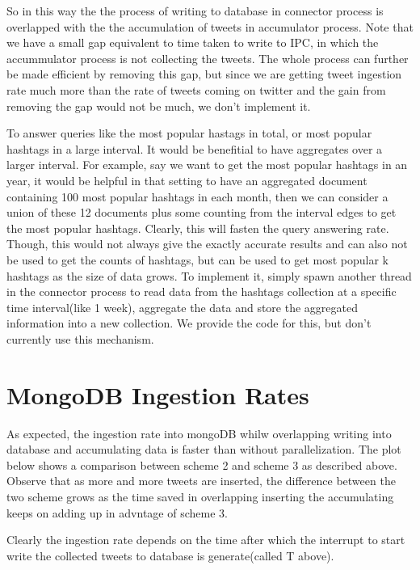 \documentclass[letterpaper,10pt,english]{sphinxmanual}
\begin{document}
So in this way the the process of writing to database in connector process is overlapped with the the accumulation of tweets in accumulator process. Note that we have a small gap equivalent to time taken to write to IPC, in which the accummulator process is not collecting the tweets. The whole process can further be made efficient by removing this gap, but since we are getting tweet ingestion rate much more than the rate of tweets coming on twitter and the gain from removing the gap would not be much, we don’t implement it.

To answer queries like the most popular hastags in total, or most popular hashtags in a large interval. It would be benefitial to have aggregates over a larger interval. For example, say we want to get the most popular hashtags in an year, it would be helpful in that setting to have an aggregated document containing 100 most popular hashtags in each month, then we can consider a union of these 12 documents plus some counting from the interval edges to get the most popular hashtags. Clearly, this will fasten the query answering rate. Though, this would not always give the exactly accurate results and can also not be used to get the counts of hashtags, but can be used to get most popular k hashtags as the size of data grows. To implement it, simply spawn another thread in the connector process to read data from the hashtags collection at a specific time interval(like 1 week), aggregate the data and store the aggregated information into a new collection. We provide the code for this, but don’t currently use this mechanism.


\section{MongoDB Ingestion Rates}
\label{\detokenize{mongoDB_data_ingestion:mongodb-ingestion-rates}}
As expected, the ingestion rate into mongoDB whilw overlapping writing into database and accumulating data is faster than without parallelization. The plot below shows a comparison between scheme 2 and scheme 3 as described above. Observe that as more and more tweets are inserted, the difference between the two scheme grows as the time saved in overlapping inserting the accumulating keeps on adding up in advntage of scheme 3.

\noindent{}

Clearly the ingestion rate depends on the time after which the interrupt to start write the collected tweets to database is generate(called T above).
\end{document}
